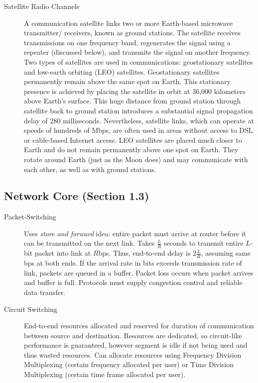 \documentclass{article}
\begin{document}
\begin{description}
    \item[Satellite Radio Channels] A communication satellite links two or more Earth-based microwave transmitter/
    receivers, known as ground stations. The satellite receives transmissions on one frequency
    band, regenerates the signal using a repeater (discussed below), and transmits
    the signal on another frequency. Two types of satellites are used in communications:
    geostationary satellites and low-earth orbiting (LEO) satellites.
    Geostationary satellites permanently remain above the same spot on Earth. This
    stationary presence is achieved by placing the satellite in orbit at 36,000 kilometers
    above Earth’s surface. This huge distance from ground station through satellite back
    to ground station introduces a substantial signal propagation delay of 280 milliseconds.
    Nevertheless, satellite links, which can operate at speeds of hundreds of Mbps,
    are often used in areas without access to DSL or cable-based Internet access.
    LEO satellites are placed much closer to Earth and do not remain permanently
    above one spot on Earth. They rotate around Earth (just as the Moon does) and may
    communicate with each other, as well as with ground stations.
\end{description}


\subsection*{Network Core (Section 1.3)}

\begin{description}
    \item[Packet-Switching] 
    Uses \textit{store and forward} idea: entire packet must arrive at router before it can be
    transmitted on the next link. Takes $\frac LR$ seconds to transmit entire $L$-bit packet into 
    link at $R$bps. Thus, end-to-end delay is $2\frac LR$, assuming same bps at both ends.
    If the arrival rate in bits exceeds transmission rate of link, packets are queued in a buffer.
    Packet loss occurs when packet arrives and buffer is full. Protocols must supply congestion
    control and reliable data transfer.
    
    \item[Circuit Switching]
    End-to-end resources allocated and reserved for duration of communication between source and 
    destination. Resources are dedicated, so circuit-like performance is guaranteed, however segment
    is idle if not being used and thus wasted resources. Can allocate resources using Frequency
    Division Multiplexing (certain frequency allocated per user) or Time Division Multiplexing
    (certain time frame allocated per user).
\end{description}
\end{document}
